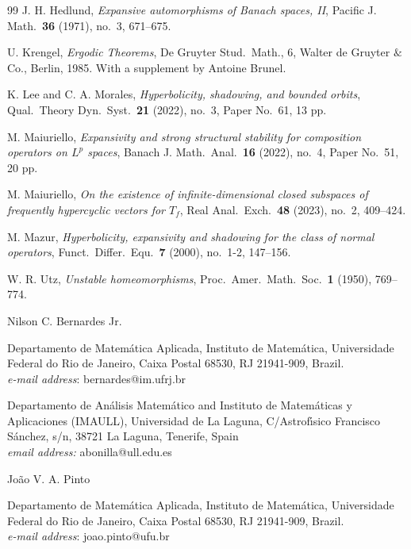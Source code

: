 \documentclass[12pt]{article}
\theoremstyle{plain}
\theoremstyle{definition}
\begin{document}
\begin{thebibliography}{99}
 J. H. Hedlund,
    {\it Expansive automorphisms of Banach spaces, II}, Pacific J. Math.\ {\bf 36} (1971), no.\ 3, 671--675.

 U. Krengel,
    {\it Ergodic Theorems}, De Gruyter Stud.\ Math., 6, Walter de Gruyter $\&$ Co., Berlin, 1985. With a supplement by Antoine Brunel.

 K. Lee and C. A. Morales,
    {\it Hyperbolicity, shadowing, and bounded orbits}, Qual.\ Theory Dyn.\ Syst.\ {\bf 21} (2022), no.\ 3, Paper No.\ 61, 13 pp.

 M. Maiuriello,
    {\it Expansivity and strong structural stability for composition operators on $L^p$ spaces},
    Banach J. Math.\ Anal.\ {\bf 16} (2022), no.\ 4, Paper No.\ 51, 20 pp.

 M. Maiuriello,
    {\it On the existence of infinite-dimensional closed subspaces of frequently hypercyclic vectors for $T_f$},
    Real Anal.\ Exch.\ {\bf 48} (2023), no.\ 2, 409--424.

 M. Mazur,
    {\it Hyperbolicity, expansivity and shadowing for the class of normal operators}, Funct.\ Differ.\ Equ.\ {\bf 7} (2000), no.\ 1-2, 147--156.

 W. R. Utz,
    {\it Unstable homeomorphisms}, Proc.\ Amer.\ Math.\ Soc.\ {\bf 1} (1950), 769--774.

\end{thebibliography}

\bigskip\bigskip\noindent
{\sc Nilson C. Bernardes Jr.}

\medskip\noindent
Departamento de Matem\'atica Aplicada, Instituto de Matem\'atica, Universidade Federal do Rio de Janeiro, 
Caixa Postal 68530, RJ 21941-909, Brazil.\\
\textit{ e-mail address}: bernardes@im.ufrj.br

\bigskip\medskip{}

\medskip\noindent
Departamento de An\'alisis Matem\'atico and Instituto de Matem\'aticas y Aplicaciones (IMAULL), 
Universidad de La Laguna, C/Astrof\'{\i}sico Francisco S\'anchez, s/n, 38721 La Laguna, Tenerife, Spain\\
\textit{ email address:} abonilla@ull.edu.es

\bigskip\medskip\noindent
{\sc Jo\~ao V. A. Pinto}

\medskip\noindent
Departamento de Matem\'atica Aplicada, Instituto de Matem\'atica, Universidade Federal do Rio de Janeiro, 
Caixa Postal 68530, RJ 21941-909, Brazil.\\
\textit{ e-mail address}: joao.pinto@ufu.br
\end{document}
